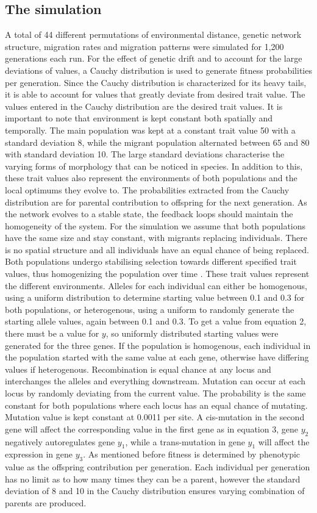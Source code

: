 \subsection{The simulation}
A total of 44 different permutations of environmental distance, genetic network structure, migration rates and migration patterns were simulated for 1,200 generations each run. For the effect of genetic drift and to account for the large deviations of values, a Cauchy distribution is used to generate fitness probabilities per generation. Since the Cauchy distribution is characterized for its heavy tails, it is able to account for values that greatly deviate from desired trait value. The values entered in the Cauchy distribution are the desired trait values. It is important to note that environment is kept constant both spatially and temporally. The main population was kept at a constant trait value 50 with a standard deviation 8, while the migrant population alternated between 65 and 80 with standard deviation 10. The large standard deviations characterise the varying forms of morphology that can be noticed in species. In addition to this, these trait values also represent the environments of both populations and the local optimums they evolve to. The probabilities extracted from the Cauchy distribution are for parental contribution to offspring for the next generation. As the network evolves to a stable state, the feedback loops should maintain the homogeneity of the system.
For the simulation we assume that both populations have the same size and stay constant, with migrants replacing individuals.  There is no spatial structure and all individuals have an equal chance of being replaced. Both populations undergo stabilising selection towards different specified trait values, thus homogenizing the population over time \cite{sato2006effect}. These trait values represent the different environments. Alleles for each individual can either be homogenous, using a uniform distribution to determine starting value between 0.1 and 0.3 for both populations, or heterogenous, using a uniform to randomly generate the starting allele values, again between 0.1 and 0.3. To get a value from equation 2, there must be a value for $y$, so uniformly distributed starting values were generated for the three genes. If the population is homogenous, each individual in the population started with the same value at each gene, otherwise have differing values if heterogenous.
Recombination is equal chance at any locus and interchanges the alleles and everything downstream. Mutation can occur at each locus by randomly deviating from the current value. The probability is the same constant for both populations where each locus has an equal chance of mutating. Mutation value is kept constant at 0.0011 per site. A cis-mutation in the second gene will affect the corresponding value in the first gene as in equation 3, gene $y_2$ negatively autoregulates gene $y_1$, while a trans-mutation in gene $y_1$ will affect the expression in gene $y_3$. As mentioned before fitness is determined by phenotypic value as the offspring contribution per generation. Each individual per generation has no limit as to how many times they can be a parent, however the standard deviation of 8 and 10 in the Cauchy distribution ensures varying combination of parents are produced.
